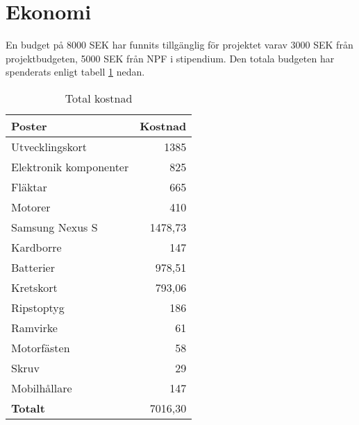 \section{Ekonomi}
En budget på 8000 SEK har funnits tillgänglig för projektet varav 3000 SEK från projektbudgeten, 5000 SEK från NPF i stipendium. Den totala budgeten har spenderats enligt tabell \ref{budget} nedan.

\begin{table}[htbp!]
\centering
\caption{Total kostnad}
\begin{tabular}{|l|r|}
\hline
\textbf{Poster} & \textbf{Kostnad} \\ 
 \hline
Utvecklingskort & 1385 \\ 
\hline
Elektronik komponenter & 825 \\ 
\hline
Fläktar & 665 \\ 
\hline
Motorer & 410 \\ 
\hline
Samsung Nexus S & 1478,73 \\ 
\hline
Kardborre & 147 \\ 
\hline
Batterier & 978,51 \\ 
\hline
Kretskort & 793,06 \\ 
\hline
Ripstoptyg & 186 \\ 
\hline
Ramvirke & 61 \\ 
\hline
Motorfästen & 58 \\ 
\hline
Skruv & 29 \\ 
\hline
Mobilhållare & 147 \\ 
\hline
\textbf{Totalt} & 7016,30 \\ 
\hline
\end{tabular}
\label{budget}
\end{table}


